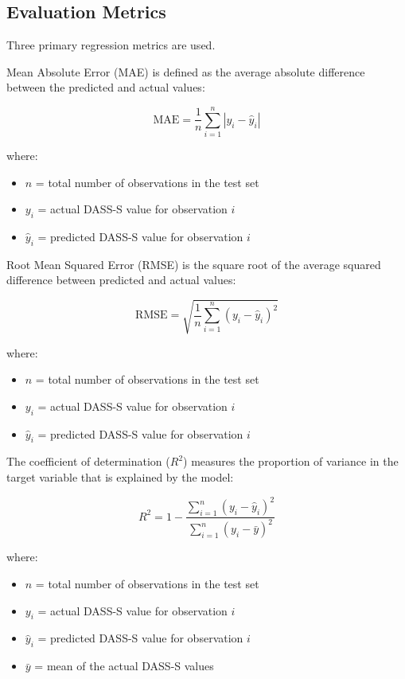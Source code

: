 \documentclass[conference]{IEEEtran}
\begin{document}
\subsection{Evaluation Metrics}

Three primary regression metrics are used.

Mean Absolute Error (MAE) is defined as the average absolute difference between the predicted and actual values:

\begin{equation}
\text{MAE} = \frac{1}{n} \sum_{i=1}^{n} |y_i - \hat{y}_i|
\end{equation}

where:
\begin{itemize}
\item $n$ = total number of observations in the test set
\item $y_i$ = actual DASS-S value for observation $i$
\item $\hat{y}_i$ = predicted DASS-S value for observation $i$
\end{itemize}

Root Mean Squared Error (RMSE) is the square root of the average squared difference between predicted and actual values:

\begin{equation}
\text{RMSE} = \sqrt{\frac{1}{n} \sum_{i=1}^{n} (y_i - \hat{y}_i)^2}
\end{equation}

where:
\begin{itemize}
\item $n$ = total number of observations in the test set
\item $y_i$ = actual DASS-S value for observation $i$
\item $\hat{y}_i$ = predicted DASS-S value for observation $i$
\end{itemize}

The coefficient of determination ($R^2$) measures the proportion of variance in the target variable that is explained by the model:

\begin{equation}
R^2 = 1 - \frac{\sum_{i=1}^{n} (y_i - \hat{y}_i)^2}{\sum_{i=1}^{n} (y_i - \bar{y})^2}
\end{equation}

where:
\begin{itemize}
\item $n$ = total number of observations in the test set
\item $y_i$ = actual DASS-S value for observation $i$
\item $\hat{y}_i$ = predicted DASS-S value for observation $i$
\item $\bar{y}$ = mean of the actual DASS-S values
\end{itemize}
\end{document}
